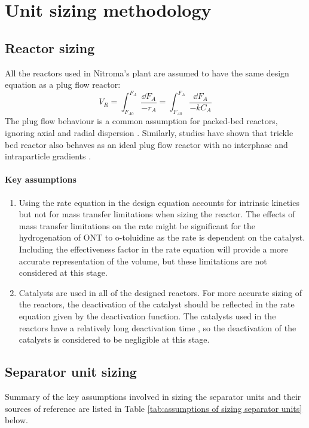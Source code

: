 \section{Unit sizing methodology}
\label{app:sizing}
\subsection{Reactor sizing}

All the reactors used in Nitroma's plant are assumed to have the same design equation as a plug flow reactor:
\begin{equation}
    V_R = \int_{F_{A0}}^{F_{A}} \frac{\dd F_A}{-r_A} = \int_{F_{A0}}^{F_{A}} \frac{\dd F_A}{-kC_A}
    \label{reactor_sizing}
\end{equation}
The plug flow behaviour is a common assumption for packed-bed reactors, ignoring axial and radial dispersion \cite{froment_chemical_nodate}. Similarly, studies have shown that  trickle bed reactor also behaves as an ideal plug flow reactor with no interphase and intraparticle gradients \cite{p_a_ramachandran_recent_1987}.

\paragraph{Key assumptions}
\begin{enumerate}
    \item Using the rate equation in the design equation accounts for intrinsic kinetics but not for mass transfer limitations when sizing the reactor. The effects of mass transfer limitations on the rate might be significant for the hydrogenation of ONT to o-toluidine as the rate is dependent on the catalyst. Including the effectiveness factor in the rate equation will provide a more accurate representation of the volume, but these limitations are not considered at this stage.
    \item Catalysts are used in all of the designed reactors. For more accurate sizing of the reactors, the deactivation of the catalyst should be reflected in the rate equation given by the deactivation function. The catalysts used in the reactors have a relatively long deactivation time \cite{temizel_novel_2020}, so the deactivation of the catalysts is considered to be negligible at this stage.
\end{enumerate}


\subsection{Separator unit sizing}
Summary of the key assumptions involved in sizing the separator units and their sources of reference are listed in Table \ref{tab:assumptions of sizing separator units} below. 

